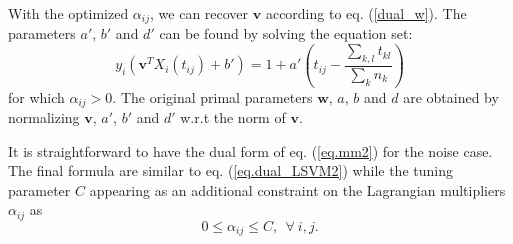\documentclass[12pt,a4paper]{article}%
\newcommand{\wv}{\mathbf{w}}
\newcommand{\vv}{\mathbf{v}}
\begin{document}
With the optimized $\alpha_{ij}$, we can recover $\vv$ according to eq. (\ref{dual_w}).
The parameters $a'$, $b'$ and $d'$ can be found by solving the equation set: $$y_i(\vv^TX_i(t_{ij}) + b')  = 1+a' \left(t_{ij} - \frac{\sum_{k,l}t_{kl}}{\sum_k n_k} \right)$$ for which $\alpha_{ij}>0$. The original primal parameters $\wv$, $a$, $b$ and $d$ are obtained by normalizing $\vv$, $a'$, $b'$ and $d'$ w.r.t the norm of $\vv$.


It is straightforward to have the dual form of eq. (\ref{eq.mm2}) for the noise case.
The final formula are similar to eq. (\ref{eq.dual_LSVM2}) while the tuning parameter $C$ appearing as an additional constraint on the Lagrangian multipliers $\alpha_{ij}$ as $$0\leq \alpha_{ij}\leq C,~~ \forall~i,j.$$





\end{document}
